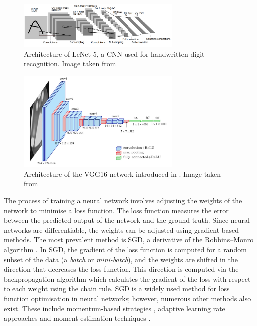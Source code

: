 \begin{figure}[htbp]
    \centering
    \includegraphics[width=0.70\textwidth]{chapter_sota/assets/lenet.png}
    \caption{Architecture of LeNet-5, a \acl{CNN} used for handwritten digit
    recognition. Image taken from \cite{DBLP:journals/pieee/LeCunBBH98}}
    \label{fig:sota:lenet5}
\end{figure}

\begin{figure}[htbp]
    \centering
    \includegraphics[width=0.7\textwidth]{chapter_sota/assets/vgg16.png}
    \caption{Architecture of the VGG16 network introduced in
    \cite{DBLP:journals/corr/SimonyanZ14a}. Image taken from
    \cite{ferguson2017automatic}}
    \label{fig:sota:vgg16}
\end{figure}


The process of training a neural network involves adjusting the weights of the
network to minimise a loss function. The loss function measures the error
between the predicted output of the network and the ground truth. Since neural
networks are differentiable, the weights can be adjusted using gradient-based
methods. The most prevalent method is \acf{SGD}, a derivative of the
Robbins–Monro algorithm \cite{robbins1951stochastic}. In \ac{SGD}, the gradient
of the loss function is computed for a random subset of the data (a \emph{batch}
or \emph{mini-batch}), and the weights are shifted in the direction that
decreases the loss function. This direction is computed via the backpropagation
algorithm \cite{rumelhart1986learning} which calculates the gradient of the loss
with respect to each weight using the chain rule. \acl{SGD} is a widely used
method for loss function optimisation in neural networks; however, numerous
other methods also exist. These include momentum-based strategies
\cite{sutskever2013importance}, adaptive learning rate approaches
\cite{zeiler2012adadelta} and moment estimation techniques
\cite{kingma2014adam}.\\

